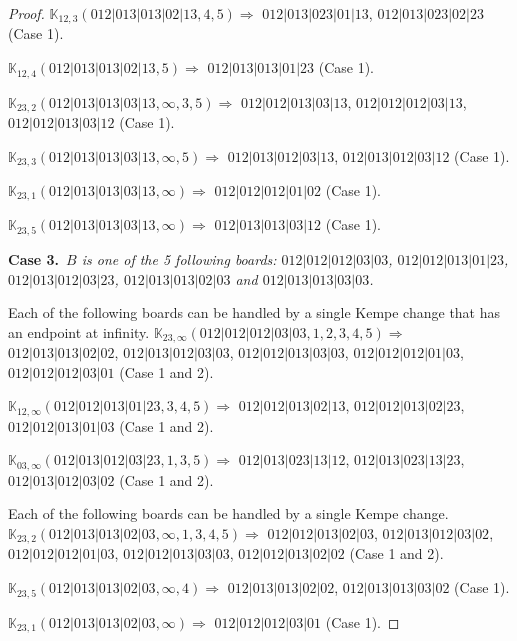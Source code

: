 \documentclass[12pt]{article}
\newcommand{\K}{\mathbb{K}}
\newcommand{\case}[2]{{\bf Case #1.}~{\it #2}~~}
\begin{document}
\begin{proof}
$\K_{12,3}(012|013|013|02|13,4, 5)\Rightarrow $ $012|013|023|01|13$, $012|013|023|02|23$ (Case 1).

$\K_{12,4}(012|013|013|02|13,5)\Rightarrow $ $012|013|013|01|23$ (Case 1).


\bigskip

$\K_{23,2}(012|013|013|03|13,\infty,3, 5)\Rightarrow $ $012|012|013|03|13$, $012|012|012|03|13$, $012|012|013|03|12$ (Case 1).

$\K_{23,3}(012|013|013|03|13,\infty,5)\Rightarrow $ $012|013|012|03|13$, $012|013|012|03|12$ (Case 1).

$\K_{23,1}(012|013|013|03|13,\infty)\Rightarrow $ $012|012|012|01|02$ (Case 1).

$\K_{23,5}(012|013|013|03|13,\infty)\Rightarrow $ $012|013|013|03|12$ (Case 1).


\bigskip


\bigskip
\case{3}{$B$ is one of the 5 following boards:
 $012|012|012|03|03$, $012|012|013|01|23$, $012|013|012|03|23$, $012|013|013|02|03$ and $012|013|013|03|03$.}

\bigskip

Each of the following boards can be handled by a single Kempe change that has an endpoint at infinity.
$\K_{23,\infty}(012|012|012|03|03,1, 2, 3, 4, 5)\Rightarrow $ $012|013|013|02|02$, $012|013|012|03|03$, $012|012|013|03|03$, $012|012|012|01|03$, $012|012|012|03|01$ (Case 1 and 2).

\bigskip

$\K_{12,\infty}(012|012|013|01|23,3, 4, 5)\Rightarrow $ $012|012|013|02|13$, $012|012|013|02|23$, $012|012|013|01|03$ (Case 1 and 2).

\bigskip

$\K_{03,\infty}(012|013|012|03|23,1, 3, 5)\Rightarrow $ $012|013|023|13|12$, $012|013|023|13|23$, $012|013|012|03|02$ (Case 1 and 2).

\bigskip

\bigskip

Each of the following boards can be handled by a single Kempe change.
$\K_{23,2}(012|013|013|02|03,\infty,1, 3, 4, 5)\Rightarrow $ $012|012|013|02|03$, $012|013|012|03|02$, $012|012|012|01|03$, $012|012|013|03|03$, $012|012|013|02|02$ (Case 1 and 2).

$\K_{23,5}(012|013|013|02|03,\infty,4)\Rightarrow $ $012|013|013|02|02$, $012|013|013|03|02$ (Case 1).

$\K_{23,1}(012|013|013|02|03,\infty)\Rightarrow $ $012|012|012|03|01$ (Case 1).



\end{proof}
\end{document}
